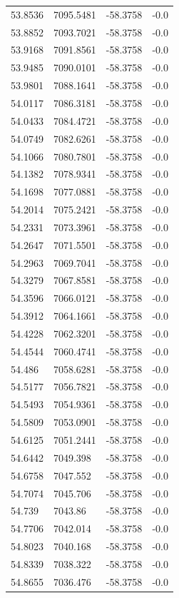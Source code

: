 \begin{table}[H]
\begin{tabular}{llll}
53.8536 & 7095.5481 & -58.3758 & -0.0 \\
53.8852 & 7093.7021 & -58.3758 & -0.0 \\
53.9168 & 7091.8561 & -58.3758 & -0.0 \\
53.9485 & 7090.0101 & -58.3758 & -0.0 \\
53.9801 & 7088.1641 & -58.3758 & -0.0 \\
54.0117 & 7086.3181 & -58.3758 & -0.0 \\
54.0433 & 7084.4721 & -58.3758 & -0.0 \\
54.0749 & 7082.6261 & -58.3758 & -0.0 \\
54.1066 & 7080.7801 & -58.3758 & -0.0 \\
54.1382 & 7078.9341 & -58.3758 & -0.0 \\
54.1698 & 7077.0881 & -58.3758 & -0.0 \\
54.2014 & 7075.2421 & -58.3758 & -0.0 \\
54.2331 & 7073.3961 & -58.3758 & -0.0 \\
54.2647 & 7071.5501 & -58.3758 & -0.0 \\
54.2963 & 7069.7041 & -58.3758 & -0.0 \\
54.3279 & 7067.8581 & -58.3758 & -0.0 \\
54.3596 & 7066.0121 & -58.3758 & -0.0 \\
54.3912 & 7064.1661 & -58.3758 & -0.0 \\
54.4228 & 7062.3201 & -58.3758 & -0.0 \\
54.4544 & 7060.4741 & -58.3758 & -0.0 \\
54.486 & 7058.6281 & -58.3758 & -0.0 \\
54.5177 & 7056.7821 & -58.3758 & -0.0 \\
54.5493 & 7054.9361 & -58.3758 & -0.0 \\
54.5809 & 7053.0901 & -58.3758 & -0.0 \\
54.6125 & 7051.2441 & -58.3758 & -0.0 \\
54.6442 & 7049.398 & -58.3758 & -0.0 \\
54.6758 & 7047.552 & -58.3758 & -0.0 \\
54.7074 & 7045.706 & -58.3758 & -0.0 \\
54.739 & 7043.86 & -58.3758 & -0.0 \\
54.7706 & 7042.014 & -58.3758 & -0.0 \\
54.8023 & 7040.168 & -58.3758 & -0.0 \\
54.8339 & 7038.322 & -58.3758 & -0.0 \\
54.8655 & 7036.476 & -58.3758 & -0.0 \\

\end{tabular}
\end{table}
